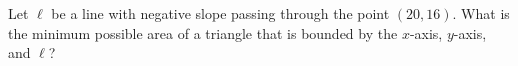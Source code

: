 Let $\ell$ be a line with negative slope passing through the point $(20,16)$. What is the minimum possible area of a triangle that is bounded by the $x$-axis, $y$-axis, and $\ell$?
